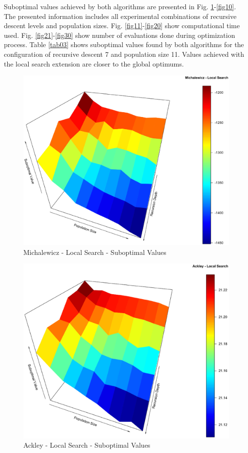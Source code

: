 \documentclass{svproc}
\begin{document}
Suboptimal values achieved by both algorithms are presented in Fig. \ref{fig01}-\ref{fig10}. The presented information includes all experimental combinations of recursive descent levels and population sizes. Fig. \ref{fig11}-\ref{fig20} show computational time used. Fig. \ref{fig21}-\ref{fig30} show number of evaluations done during optimization process. Table \ref{tab03} shows suboptimal values found by both algorithms for the configuration of recursive descent 7 and population size 11. Values achieved with the local search extension are closer to the global optimums.

\begin{figure}[tbp]
\centering
\includegraphics[width=1.0\hsize,height=0.65\hsize]{fig03.eps}
\caption{Michalewicz - Local Search - Suboptimal Values}
\label{fig01}
\end{figure}

\begin{figure}[tbp]
\centering
\includegraphics[width=1.0\hsize,height=0.65\hsize]{fig06.eps}
\caption{Ackley - Local Search - Suboptimal Values}
\label{fig02}
\end{figure}
\end{document}
